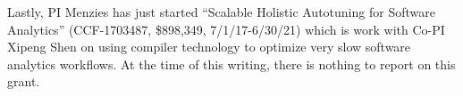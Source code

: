 Lastly, PI Menzies has just started ``Scalable Holistic Autotuning for Software Analytics''
(CCF-1703487, \$898,349, 7/1/17-6/30/21) which is work with Co-PI Xipeng Shen
on using compiler technology to optimize very slow software analytics workflows. 
At the time of this writing, there is nothing to report on this grant.
